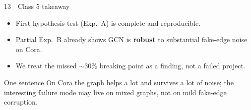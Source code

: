 \documentclass[
  english,
  aspectratio=169,
]{beamer}
\begin{document}
\begin{frame}{13~~Class 5 takeaway}
  \begin{itemize}
    \item First hypothesis test (Exp.\ A) is complete and reproducible.
    \item Partial Exp.\ B already shows GCN is \textbf{robust} to substantial
      fake-edge noise on Cora.
    \item We treat the missed $\sim$30\% breaking point as a finding,
      not a failed project.
  \end{itemize}

  \vspace{0.45em}
  \begin{block}{One sentence}
    On Cora the graph helps a lot and survives a lot of noise;
    the interesting failure mode may live on mixed graphs, not on
    mild fake-edge corruption.
  \end{block}
\end{frame}
\end{document}
